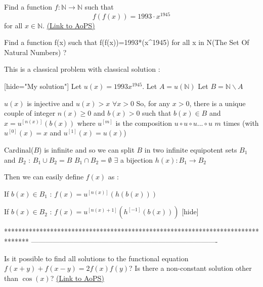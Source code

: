 \begin{problem}
	Find a function $f: \mathbb N \to \mathbb N$ such that \[f(f(x))=1993\cdot x^{1945}\] for all $x \in \mathbb N$.
	\flushright \href{https://artofproblemsolving.com/community/c6h252203}{(Link to AoPS)}
\end{problem}



\begin{solution}
	\begin{tcolorbox}Find a function f(x) such that f(f(x))=1993*(x^1945) for all x in N(The Set Of Natural Numbers) ?\end{tcolorbox}

This is a classical problem with classical solution :

[hide="My solution"]
Let $ u(x)=1993x^{1945}$.
Let $ A=u(\mathbb N)$
Let $ B=\mathbb N\backslash A$

$ u(x)$ is injective and $ u(x)>x$ $ \forall x>0$
So, for any $ x>0$, there is a unique couple of integer $ n(x)\geq 0$ and $ b(x)>0$ such that $ b(x)\in B$ and $ x=u^{[n(x)]}(b(x))$ where $ u^{[m]}$ is the composition $ u\circ u\circ u ... \circ u$ $ m$ times (with $ u^{[0]}(x)=x$ and $ u^{[1]}(x)=u(x)$)

Cardinal($ B$) is infinite and so we can split $ B$ in two infinite equipotent sets $ B_1$ and $ B_2$ :
$ B_1\cup B_2=B$
$ B_1\cap B_2=\emptyset$
$ \exists$ a bijection  $ h(x): B_1\to B_2$

Then we can easily define $ f(x)$ as :

If $ b(x)\in B_1$ : $ f(x)=u^{[n(x)]}(h(b(x)))$

If $ b(x)\in B_2$ : $ f(x)=u^{[n(x)+1]}(h^{[-1]}(b(x)))$
[\/hide]
\end{solution}
*******************************************************************************
-------------------------------------------------------------------------------

\begin{problem}
	Is it possible to find all solutions to the functional equation $ f(x + y) + f(x - y) = 2f(x)f(y)$? Is there a non-constant solution other than $ \cos(x)$?
	\flushright \href{https://artofproblemsolving.com/community/c6h256322}{(Link to AoPS)}
\end{problem}



